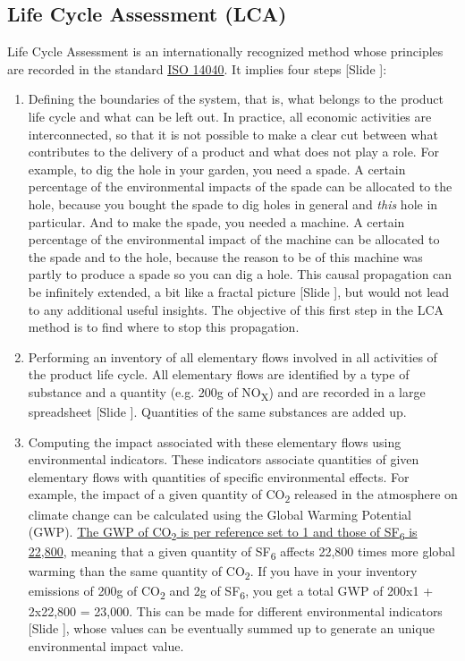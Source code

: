 \documentclass{article}
\newcounter{slide}
\begin{document}
\subsection{Life Cycle Assessment (LCA)}
\label{sec:lca}
Life Cycle Assessment is an internationally recognized method whose principles are recorded in the standard \href{https://www.iso.org/en/standard/37456.html}{ISO 14040}. It implies four steps {\color{blue}[Slide ]}:
\begin{enumerate}
	\item Defining the boundaries of the system, that is, what belongs to the product life cycle and what can be left out. In practice, all economic activities are interconnected, so that it is not possible to make a clear cut between what contributes to the delivery of a product and what does not play a role. For example, to dig the hole in your garden, you need a spade. A certain percentage of the environmental impacts of the spade can be allocated to the hole, because you bought the spade to dig holes in general and \emph{this} hole in particular. And to make the spade, you needed a machine. A certain percentage of the environmental impact of the machine can be allocated to the spade and to the hole, because the reason to be of this machine was partly to produce a spade so you can dig a hole. This causal propagation can be infinitely extended, a bit like a fractal picture {\color{blue}[Slide ]}, but would not lead to any additional useful insights. The objective of this first step in the LCA method is to find where to stop this propagation.
	\item Performing an inventory of all elementary flows involved in all activities of the product life cycle. All elementary flows are identified by a type of substance and a quantity (e.g. 200g of NO\textsubscript{X}) and are recorded in a large spreadsheet {\color{blue}[Slide ]}. Quantities of the same substances are added up. 
	\item Computing the impact associated with these elementary flows using environmental indicators. These indicators associate quantities of given elementary flows with quantities of specific environmental effects. For example, the impact of a given quantity of CO\textsubscript{2} released in the atmosphere on climate change can be calculated using the Global Warming Potential (GWP). \href{http://www.ghgprotocol.org/sites/default/files/ghgp/Global-Warming-Potential-Values\%20\%28Feb\%2016\%202016\%29_1.pdf}{The GWP of CO\textsubscript{2} is per reference set to 1 and those of SF\textsubscript{6} is 22,800}, meaning that a  given quantity of SF\textsubscript{6} affects 22,800 times more global warming than the same quantity of CO\textsubscript{2}. If you have in your inventory emissions of 200g of CO\textsubscript{2} and 2g of SF\textsubscript{6}, you get a total GWP of 200x1 + 2x22,800 = 23,000. This can be made for different environmental indicators {\color{blue}[Slide ]}, whose values can be eventually summed up to generate an unique environmental impact value.

\end{enumerate}
\end{document}
